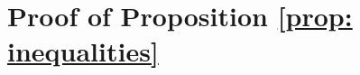 \documentclass{amsart}
\theoremstyle{definition}
\theoremstyle{remark}
\numberwithin{equation}{section}
\newcommand{\newword}[1]{\textbf{\emph{#1}}}
\newcommand{\0}{{\mathbf{0}}}
\newenvironment{ex}{\refstepcounter{proposition}\begin{proof}[Example \emph{\thethm}]\renewcommand*{\qedsymbol}{\(\blacksquare\)}}{\end{proof}}
\begin{document}
%
%
%	
%


\section{Proof of Proposition \ref{prop: inequalities}}


\end{document}
